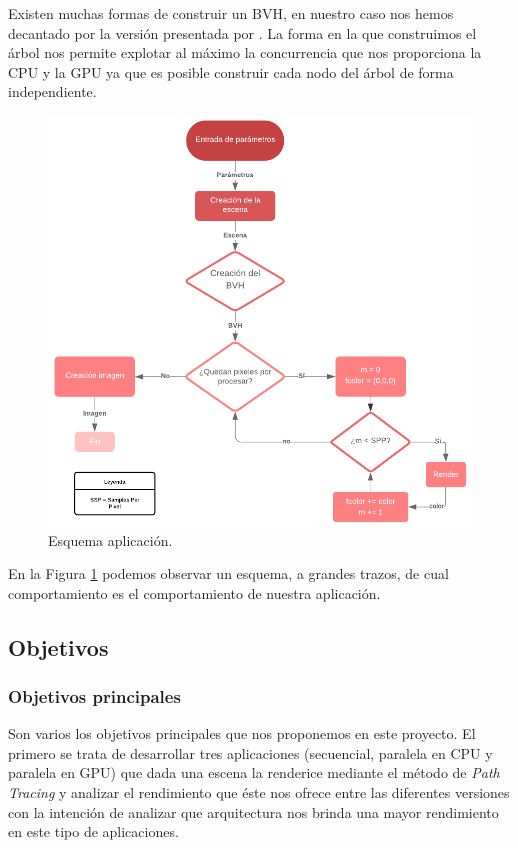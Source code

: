 \documentclass[titlepage,12pt]{report}
\begin{document}
Existen muchas formas de construir un BVH, en nuestro caso nos hemos decantado por la versión presentada por \citep{Karras2012, Karras2013}. La forma en la que construimos el árbol nos permite explotar al máximo la concurrencia que nos proporciona la CPU y la GPU ya que es posible construir cada nodo del árbol de forma independiente.

\begin{figure}[ht]
	\centering
	\includegraphics[scale=0.35]{media/Esquema.png}
	\caption{Esquema aplicación.}
	\label{Esquema}
\end{figure}

En la Figura \ref{Esquema} podemos observar un esquema, a grandes trazos, de cual comportamiento es el comportamiento de nuestra aplicación.

\subsection{Objetivos}

\subsubsection{Objetivos principales}

Son varios los objetivos principales que nos proponemos en este proyecto. El primero se trata de desarrollar tres aplicaciones (secuencial, paralela en CPU y paralela en GPU) que dada una escena la renderice mediante el método de \textit{Path Tracing} y analizar el rendimiento que éste nos ofrece entre las diferentes versiones con la intención de analizar que arquitectura nos brinda una mayor rendimiento en este tipo de aplicaciones.
\end{document}
